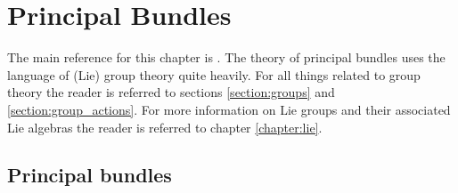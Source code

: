 \chapter{Principal Bundles}\label{chapter:principal_bundles}

    The main reference for this chapter is \cite{principal_bundles}. The theory of principal bundles uses the language of (Lie) group theory quite heavily. For all things related to group theory the reader is referred to sections \ref{section:groups} and \ref{section:group_actions}. For more information on Lie groups and their associated Lie algebras the reader is referred to chapter \ref{chapter:lie}.

\section{Principal bundles}

